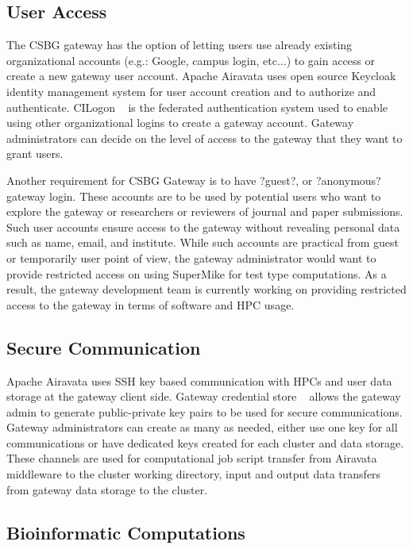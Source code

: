 \documentclass[sigconf]{acmart}
\begin{document}
\subsection{User Access}
The CSBG gateway has the option of letting users use already existing organizational accounts (e.g.: Google, campus login, etc...) to gain access or create a new gateway user account. Apache Airavata uses open source Keycloak ~\cite{christie2017using} identity management system for user account creation and to authorize and authenticate.  CILogon ~\cite{basney2014cilogon} is the federated authentication system used to enable using other organizational logins to create a gateway account. Gateway administrators can decide on the level of access to the gateway that they want to grant users. 

Another requirement for CSBG Gateway is to have ?guest?, or ?anonymous? gateway login. These accounts are to be used by potential users who want to explore the gateway or researchers or reviewers of journal and paper submissions. Such user accounts ensure access to the gateway without revealing personal data such as name, email, and institute. While such accounts are practical from guest or temporarily user point of view, the gateway administrator would want to provide restricted access on using SuperMike for test type computations.  As a result, the gateway development team is currently working on providing restricted access to the gateway in terms of  software and HPC usage. 

\subsection{ Secure Communication}
Apache Airavata uses SSH key based communication with HPCs and user data storage at the gateway client side. Gateway credential store ~\cite{kanewala2014credential} allows the gateway admin to generate public-private key pairs to be used for secure communications. Gateway administrators can create as many as needed, either use one key for all communications or have dedicated keys created for each cluster and data storage. These channels are used for computational job script transfer from Airavata middleware to the cluster working directory, input  and output data transfers from gateway data storage to the cluster.

\subsection{Bioinformatic Computations}
\end{document}
